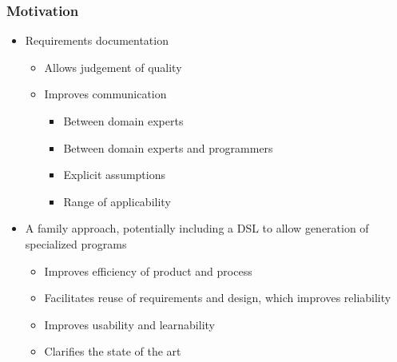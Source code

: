 \documentclass[t,12pt,numbers,fleqn]{beamer}
\begin{document}
\begin{frame}

\frametitle{Motivation}
\begin{itemize}

\item Requirements documentation
\begin{itemize}
\item Allows judgement of quality %
\item Improves communication
\begin{itemize}
\item Between domain experts%
\item Between domain experts and programmers %
\item Explicit assumptions
\item Range of applicability
\end{itemize}
\end{itemize}

\item A family approach, potentially including a DSL to allow generation of specialized programs
\begin{itemize}
\item Improves efficiency of product and process
\item Facilitates reuse of requirements and design, which improves reliability
\item Improves usability and learnability%
\item Clarifies the state of the art
\end{itemize}

\end{itemize}

\end{frame}

\end{document}
